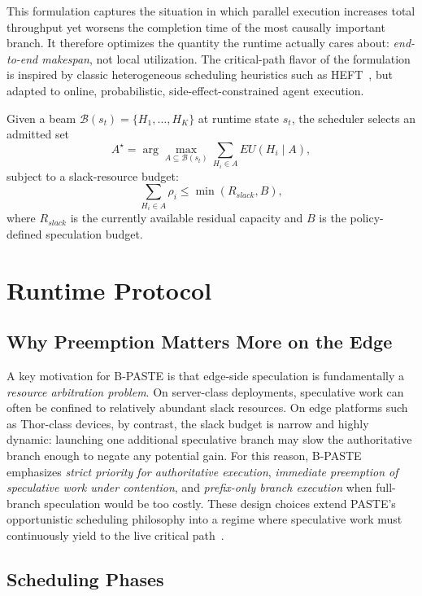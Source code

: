 \documentclass[10pt,twocolumn]{article}
\begin{document}
This formulation captures the situation in which parallel execution increases total throughput yet worsens the completion time of the most causally important branch. It therefore optimizes the quantity the runtime actually cares about: \emph{end-to-end makespan}, not local utilization. The critical-path flavor of the formulation is inspired by classic heterogeneous scheduling heuristics such as HEFT~\cite{heft}, but adapted to online, probabilistic, side-effect-constrained agent execution.

Given a beam $\mathcal{B}(s_t)=\{H_1,\dots,H_K\}$ at runtime state $s_t$, the scheduler selects an admitted set
\begin{equation}
A^\star = \arg\max_{A \subseteq \mathcal{B}(s_t)} \sum_{H_i \in A} EU(H_i \mid A),
\end{equation}
subject to a slack-resource budget:
\begin{equation}
\sum_{H_i \in A} \rho_i \le \min(R_{slack}, B),
\end{equation}
where $R_{slack}$ is the currently available residual capacity and $B$ is the policy-defined speculation budget.

\section{Runtime Protocol}

\subsection{Why Preemption Matters More on the Edge}

A key motivation for B-PASTE is that edge-side speculation is fundamentally a \emph{resource arbitration problem}. On server-class deployments, speculative work can often be confined to relatively abundant slack resources. On edge platforms such as Thor-class devices, by contrast, the slack budget is narrow and highly dynamic: launching one additional speculative branch may slow the authoritative branch enough to negate any potential gain. For this reason, B-PASTE emphasizes \emph{strict priority for authoritative execution}, \emph{immediate preemption of speculative work under contention}, and \emph{prefix-only branch execution} when full-branch speculation would be too costly. These design choices extend PASTE's opportunistic scheduling philosophy into a regime where speculative work must continuously yield to the live critical path~\cite{paste}.

\subsection{Scheduling Phases}
\end{document}
